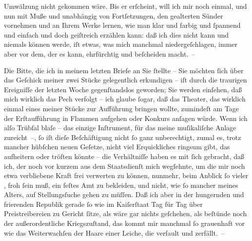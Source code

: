                Umwälzung nicht gekommen wäre. Bis er erſcheint, will ich mir noch einmal, und nun
               mit Muße und unabhängig von Fortſetzungen, den gealterten Sünder vornehmen und an
               Ihrem Werke lernen, wie man klar und farbig und{ }ſpannend und einfach und doch
               geiſtreich erzählen kann: daß ich dies nicht kann und niemals können werde, iſt
               etwas, was mich manchmal niedergeſchlagen, immer aber vor dem, der es kann,
               ehrfürchtig und beſcheiden {\pb}macht. –\pend
           
\pstart
           Die Bitte, die ich in meinem letzten Briefe an Sie{ }ſtellte – Sie möchten{ }ſich über
               das Geſchick meiner zwei Stücke gelegentlich erkundigen – iſt durch die traurigen Ereigniſſe der
               letzten Woche gegenſtandslos geworden; Sie werden einſehen, daß mich wirklich das
               Pech verfolgt – ich glaube{ }ſogar, daß das Theater, das wirklich einmal eines meiner
               Stücke zur Aufführung bringen wollte, zumindeſt am Tage der Erſtaufführung in Flammen
               aufgehen oder Konkurs anſagen würde. Wenn ich alſo Trübſal blaſe – das einzige
               Inſtrument, für das meine muſikaliſche Anlage zureicht –,{ }ſo iſt dieſe Beſchäftigung
               nicht{ }ſo ganz unberechtigt, zumal es, trotz mancher hübſchen neuen Geſetze, nicht
               viel Erquickliches ringsum gibt, das aufheitern oder tröſten könnte – die
               Verhältniſſe haben es mit{ }ſich gebracht, daß ich, der noch vor kurzem aus dem
               Staatsdienſt mich wegſehnte, um die mir noch etwa verbliebene Kraft frei verwerten zu
               können, nunmehr, beim Anblick{ }ſo vieler \label{K_L02315-1v}\label{K_L02315-1}, froh{ }ſein muß, ein feſtes Amt zu bekleiden, und nicht, wie{ }ſo
               mancher meines Alters, auf Stel{\pb}lungsſuche
               gehen zu müſſen. Daß ich aber in der hungernden und frierenden Republik gerade{ }ſo wie im Kaiſerſtaat Tag
               für Tag über Preistreibereien zu Gericht{ }ſitze, als wäre gar nichts geſchehen, als
               beſtünde noch der außerordentliche Kriegszuſtand, das kommt mir manchmal{ }ſo
               grauenhaft vor wie das Weiterwachſen der Haare einer Leiche, die verfault und
               zerfällt. –\pend
           
